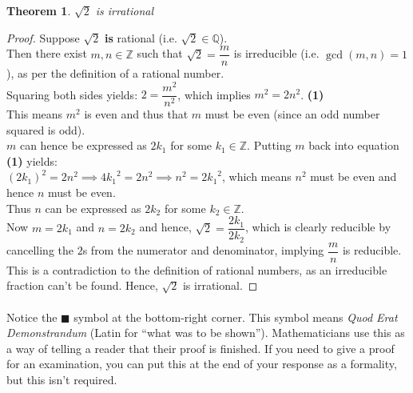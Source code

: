 \documentclass[12pt, a4paper, titlepage, twoside]{article}
\newcommand*{\Z}{\mathbb{Z}}
\newcommand*{\Q}{\mathbb{Q}}
\newtheorem*{theorem*}{Theorem}
\begin{document}
	\begin{pf}
		\label{pf:root2}
		\begin{theorem*}
			$\sqrt{2}$ is irrational
		\end{theorem*}

		\tcbline		
		
		\begin{proof}
			Suppose $\sqrt{2}$ \textbf{is} rational (i.e. $\sqrt{2} \in \Q$).\\
			
			Then there exist $m, n \in \Z$ such that $\sqrt{2} =  \dfrac{m}{n}$ is irreducible (i.e. $\gcd(m,n) = 1$), 
			as per the definition of a rational number. \\
			
			Squaring both sides yields: $2 = \dfrac{m^2}{n^2}$, which implies $m^2 = 2n^2$. \hfill \textbf{(1)} \\
			
			This means $m^2$ is even and thus that $m$ must be even (since an odd number squared is odd).\\
			
			$m$ can hence be expressed as $2k_1$ for some $k_1 \in \Z$. Putting $m$ back into equation \textbf{(1)} yields:\\
			
			$(2k_1)^2 = 2n^2 \implies 4{k_1}^2 = 2n^2 \implies n^2 = 2{k_1}^2$, which means $n^2$ must be even and hence $n$
			must be even.\\
			
			Thus $n$ can be expressed as $2k_2$ for some $k_2 \in \Z$.\\
			
			Now $m = 2k_1$ and $n = 2k_2$ and hence, $\sqrt{2} = \dfrac{2k_1}{2k_2}$, which is clearly reducible by cancelling
			the $2$s from the numerator and denominator, implying $\dfrac{m}{n}$ is reducible.\\
			
			This is a contradiction to the definition of rational numbers, as an irreducible fraction can't be found. Hence,
			$\sqrt{2}$ is irrational.
		\end{proof}
		
	\end{pf}
	
	\paragraph{}
	Notice the $\blacksquare$ symbol at the bottom-right corner. This symbol means \textit{Quod Erat Demonstrandum} 
	(Latin for ``what was to be shown''). Mathematicians use this as a way of telling a reader that their proof is finished.
	If you need to give a proof for an examination, you can put this at the end of your response as a formality, but this isn't
	required.
	
\end{document}
